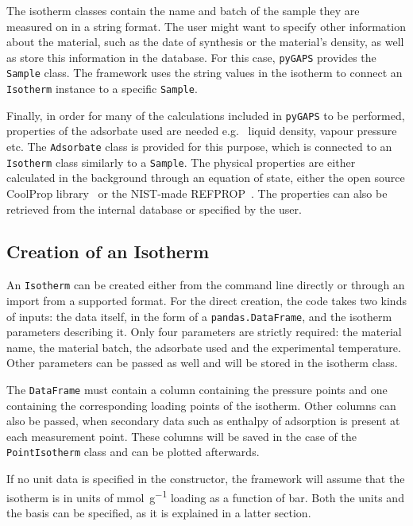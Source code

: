 The isotherm classes contain the name and batch of the sample they are measured on
in a string format. The user might want to specify other information about the material,
such as the date of synthesis or the material's density,
as well as store this information in the database.
For this case, \texttt{pyGAPS} provides the \texttt{Sample} class. 
The framework uses the string values 
in the isotherm to connect an \texttt{Isotherm} instance to a specific \texttt{Sample}.

Finally, in order for many of the calculations included in \texttt{pyGAPS} to be performed, 
properties of the adsorbate used are needed e.g. \ liquid density, vapour pressure etc.
The \texttt{Adsorbate} class is provided for this purpose, 
which is connected to an \texttt{Isotherm} class similarly to a \texttt{Sample}. The physical 
properties are either calculated in the background through an equation of state,
either the open source CoolProp library~\cite{bellPurePseudopureFluid2014} or 
the NIST-made REFPROP~\cite{lemmonNISTReferenceFluid1989}.
The properties can also be retrieved from the internal database or specified by the user. 

\subsection{Creation of an Isotherm}

An \texttt{Isotherm} can be created either from the command line directly or through an import 
from a supported format. For the direct creation, the code takes 
two kinds of inputs: the data itself, in the form of a \texttt{pandas.DataFrame}, and the
isotherm parameters describing it. Only four parameters are strictly required:
the material name, the material batch, the adsorbate used and the experimental temperature.
Other parameters can be passed as well and will be stored in the isotherm class.

The \texttt{DataFrame} must contain a column containing the pressure points and one containing
the corresponding loading points of the isotherm. Other columns can also be passed, when
secondary data such as enthalpy of adsorption is present at each measurement point.
These columns will be saved in the case of the \texttt{PointIsotherm} class and can be
plotted afterwards.

If no unit data is specified in the constructor, the framework will assume that the 
isotherm is in units of \si{\milli\mole\per\gram} loading as a function of \si{\bar}.
Both the units and the basis can be specified, as it is explained in a latter section.

